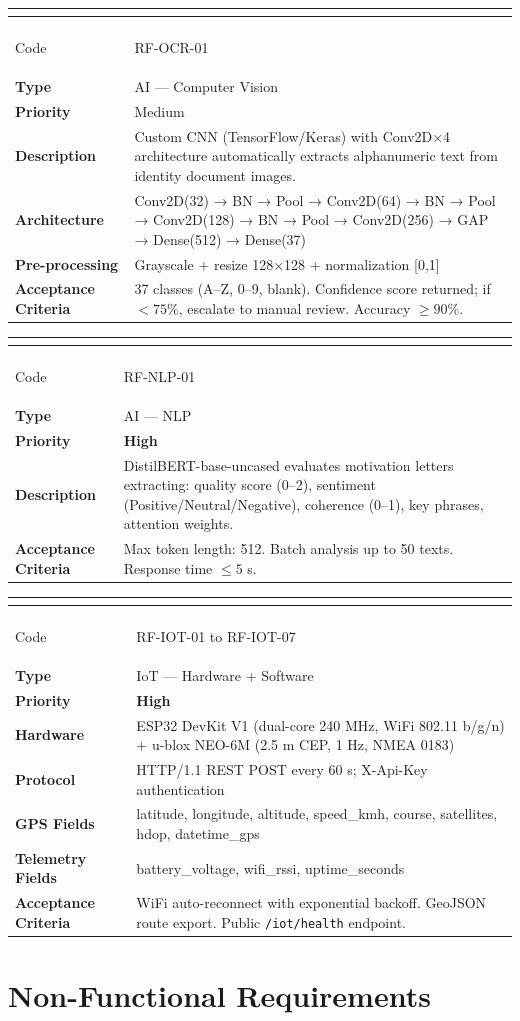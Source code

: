\documentclass[12pt,a4paper,twoside]{report}
\newenvironment{reqenv}[2]{%
  \begin{longtable}{|>{\columncolor{rowGray}\bfseries\small}p{3.8cm}|>{\small}p{10.5cm}|}
  \hline
  \multicolumn{2}{|>{\columncolor{tableHdr}}c|}{\textcolor{white}{\textbf{#1 — #2}}} \\
  \hline \endfirsthead
  \hline
  \multicolumn{2}{|>{\columncolor{tableHdr}}c|}{\textcolor{white}{\textbf{#1 — #2 (Cont.)}}} \\
  \hline \endhead \hline
}{%
  \end{longtable}
}
\newcommand{\reqrow}[2]{#1 & #2 \\[2pt] \hline}
\begin{document}
\begin{reqenv}{RF-OCR-01}{Computer Vision — CNN OCR}
\reqrow{Code}{RF-OCR-01}
\reqrow{Type}{AI — Computer Vision}
\reqrow{Priority}{Medium}
\reqrow{Description}{Custom CNN (TensorFlow/Keras) with Conv2D×4 architecture automatically extracts alphanumeric text from identity document images.}
\reqrow{Architecture}{Conv2D(32) → BN → Pool → Conv2D(64) → BN → Pool → Conv2D(128) → BN → Pool → Conv2D(256) → GAP → Dense(512) → Dense(37)}
\reqrow{Pre-processing}{Grayscale + resize 128×128 + normalization [0,1]}
\reqrow{Acceptance Criteria}{37 classes (A--Z, 0--9, blank). Confidence score returned; if $< 75\%$, escalate to manual review. Accuracy $\geq 90\%$.}
\end{reqenv}

\begin{reqenv}{RF-NLP-01}{Transformer NLP — Letter Analysis}
\reqrow{Code}{RF-NLP-01}
\reqrow{Type}{AI — NLP}
\reqrow{Priority}{\textcolor{uscoRed}{\textbf{High}}}
\reqrow{Description}{DistilBERT-base-uncased evaluates motivation letters extracting: quality score (0--2), sentiment (Positive/Neutral/Negative), coherence (0--1), key phrases, attention weights.}
\reqrow{Acceptance Criteria}{Max token length: 512. Batch analysis up to 50 texts. Response time $\leq 5$ s.}
\end{reqenv}

\begin{reqenv}{RF-IOT-01}{GPS Telemetry — ESP32 + NEO-6M}
\reqrow{Code}{RF-IOT-01 to RF-IOT-07}
\reqrow{Type}{IoT — Hardware + Software}
\reqrow{Priority}{\textcolor{uscoRed}{\textbf{High}}}
\reqrow{Hardware}{ESP32 DevKit V1 (dual-core 240 MHz, WiFi 802.11 b/g/n) + u-blox NEO-6M (2.5 m CEP, 1 Hz, NMEA 0183)}
\reqrow{Protocol}{HTTP/1.1 REST POST every 60 s; X-Api-Key authentication}
\reqrow{GPS Fields}{latitude, longitude, altitude, speed\_kmh, course, satellites, hdop, datetime\_gps}
\reqrow{Telemetry Fields}{battery\_voltage, wifi\_rssi, uptime\_seconds}
\reqrow{Acceptance Criteria}{WiFi auto-reconnect with exponential backoff. GeoJSON route export. Public \texttt{/iot/health} endpoint.}
\end{reqenv}

\section{Non-Functional Requirements}
\end{document}
